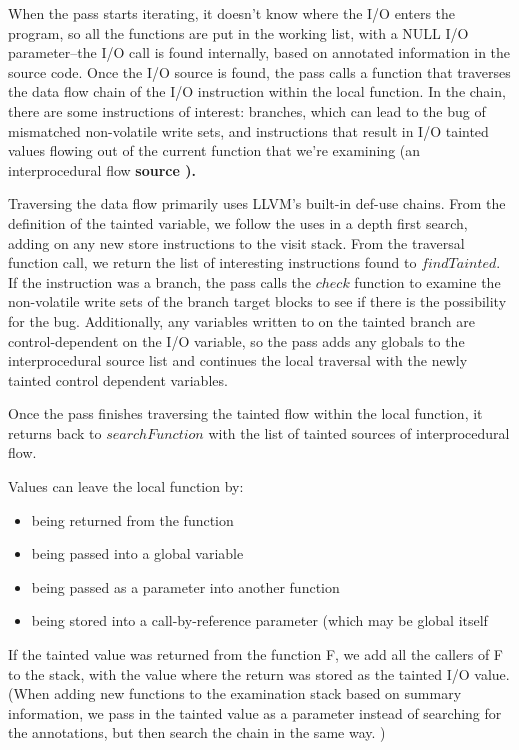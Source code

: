 When the pass starts iterating, it doesn't know where the I/O enters the program, so all the functions are put in the working list, with a NULL I/O parameter--the I/O call is found internally, based on annotated information in the source code. Once the I/O source is found, the pass calls a function that traverses the data flow chain of the I/O instruction within the local function. In the chain, there are some instructions of interest: branches, which can lead to the bug of mismatched non-volatile write sets, and instructions that result in I/O tainted values flowing out of the current function that we're examining (an interprocedural flow \bf{source} ). 
	
Traversing the data flow primarily uses LLVM's built-in def-use chains. From the definition of the tainted variable, we follow the uses in a depth first search, adding on any new store instructions to the visit stack. 
From the traversal function call, we return the list of interesting instructions found to $findTainted$. If the instruction was a branch, the pass calls the $check$ function to examine the non-volatile write sets of the branch target blocks to see if there is the possibility for the bug. Additionally, any variables written to on the tainted branch are control-dependent on the I/O variable, so the pass adds any globals to the interprocedural source list and continues the local traversal with the newly tainted control dependent variables.

Once the pass finishes traversing the tainted flow within the local function, it returns back to $searchFunction$ with the list of tainted sources of interprocedural flow.
	
Values can leave the local function by: 
\begin{itemize}
\item{being returned from the function} 
\item{being passed into a global variable} 
\item{being passed as a parameter into another function}
\item{being stored into a call-by-reference parameter (which may be global itself}
\end{itemize}	
	
If the tainted value was returned from the function F, we add all the callers of F to the stack, with the value where the return was stored as the tainted I/O value. (When adding new functions to the examination stack based on summary information, we pass in the tainted value as a parameter instead of searching for the annotations, but then search the chain in the same way. )
	
